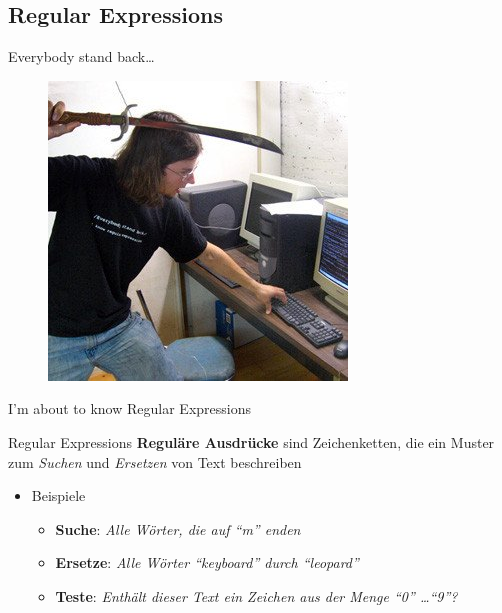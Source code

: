 \documentclass[18pt]{beamer}
\newcommand{\quotes}[1]{``#1''}
\begin{document}
\subsection{Regular Expressions}

\begin{frame}{Everybody stand back\dots}
    \begin{figure}
        \includegraphics[scale=1.4]{img/regex_shirt.jpg}
    \end{figure}
\end{frame}



\begin{frame}{I'm about to know Regular Expressions}
    \begin{block}{Regular Expressions}
        \textbf{Reguläre Ausdrücke} sind Zeichenketten, die ein Muster zum \textit{Suchen} und \textit{Ersetzen} von Text beschreiben
    \end{block}

    \begin{itemize}
        \item Beispiele
        \begin{itemize}
            \item \textbf{Suche}: \textit{Alle Wörter, die auf \quotes{m} enden}
            \item \textbf{Ersetze}: \textit{Alle Wörter \quotes{keyboard} durch \quotes{leopard}}
            \item \textbf{Teste}: \textit{Enthält dieser Text ein Zeichen aus der Menge \quotes{0} \dots \quotes{9}?}
        \end{itemize}

    \end{itemize}

\end{frame}
\end{document}
